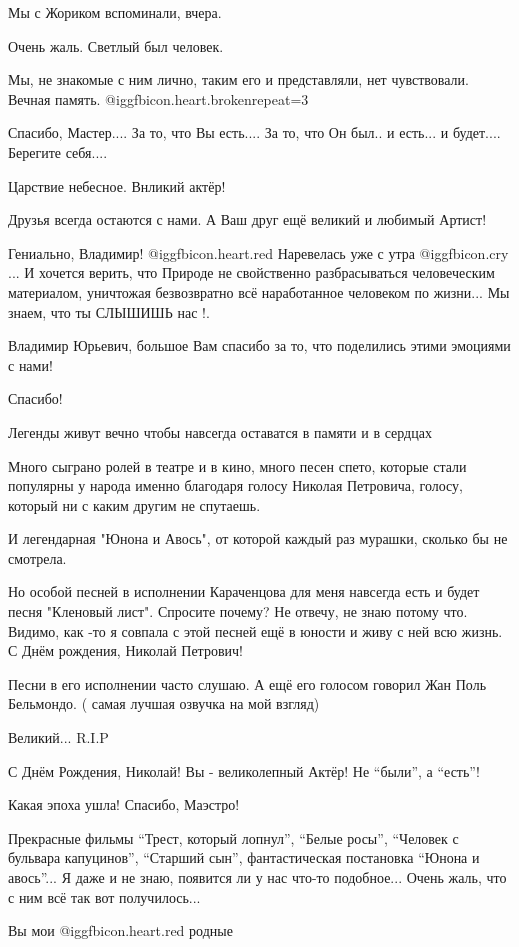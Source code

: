 \begin{itemize}
Мы с Жориком вспоминали, вчера.

Очень жаль. Светлый был человек.

Мы, не знакомые с ним лично, таким его и представляли, нет чувствовали. Вечная память. @igg{fbicon.heart.broken}{repeat=3} 

Спасибо, Мастер....
За то, что Вы есть....
За то, что Он был.. и есть... и будет....
Берегите себя....

Царствие небесное. Внликий актёр!

Друзья всегда остаются с нами. А Ваш друг ещё великий и любимый Артист!


Гениально, Владимир! @igg{fbicon.heart.red} Наревелась уже с утра  @igg{fbicon.cry}  ... И хочется верить, что
Природе не свойственно разбрасываться человеческим материалом, уничтожая
безвозвратно всё наработанное человеком по жизни... Мы знаем, что ты СЛЫШИШЬ
нас !.

Владимир Юрьевич, большое Вам спасибо за то, что поделились этими эмоциями с нами!

Спасибо!

Легенды живут вечно чтобы навсегда оставатся в памяти и в сердцах


Много сыграно ролей в театре и в кино, много песен спето, которые стали
популярны у народа именно благодаря голосу Николая Петровича, голосу, который
ни с каким другим не спутаешь.

И легендарная "Юнона и Авось", от которой каждый раз мурашки, сколько бы не
смотрела.

Но особой песней в исполнении Караченцова для меня навсегда есть и будет песня "Кленовый лист".
Спросите почему?
Не отвечу, не знаю потому что.
Видимо, как -то я совпала с этой песней ещё в юности и живу с ней всю жизнь.
С Днём рождения, Николай Петрович!

Песни в его исполнении часто слушаю. А ещё его голосом говорил Жан Поль Бельмондо. ( самая лучшая озвучка на мой взгляд)

Великий... R.I.P

С Днём Рождения, Николай! Вы - великолепный Актёр! Не \enquote{были}, а \enquote{есть}!

Какая эпоха ушла! Спасибо, Маэстро!


Прекрасные фильмы \enquote{Трест, который лопнул}, \enquote{Белые росы}, \enquote{Человек с бульвара
капуцинов}, \enquote{Старший сын}, фантастическая постановка \enquote{Юнона и авось}... Я даже
и не знаю, появится ли у нас что-то подобное... Очень жаль, что с ним всё так
вот получилось...


Вы мои @igg{fbicon.heart.red} родные


\end{itemize} %
